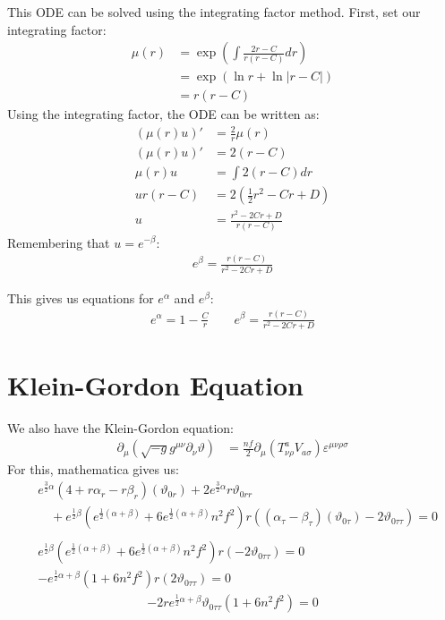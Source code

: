 \documentclass[12pt]{article}
\begin{document}
This ODE can be solved using the integrating factor method. First, set our integrating factor:
\begin{align*}
  \mu(r) &= \exp\left(\int \frac{2r-C}{r(r-C)} dr\right) \\
  &= \exp(\ln{r} + \ln|r-C|) \\
  &= r(r-C)
\end{align*}
Using the integrating factor, the ODE can be written as:
\begin{align*}
  (\mu(r)u)' &= \frac{2}{r}\mu(r) \\
  (\mu(r)u)' &= 2(r-C) \\
  \mu(r)u &= \int 2(r-C) dr \\
  ur(r-C) &= 2\left(\frac{1}{2}r^2 - Cr + D\right) \\
  u &= \frac{r^2 - 2Cr + D}{r(r-C)}
\end{align*}
Remembering that $u = e^{-\beta}$:
\begin{align}
  e^\beta = \frac{r(r-C)}{r^2 - 2Cr + D}
\end{align}

This gives us equations for $e^\alpha$ and $e^\beta$:
\begin{align*}
  e^\alpha = 1 - \frac{C}{r} \qquad e^\beta = \frac{r(r-C)}{r^2 - 2Cr + D}
\end{align*}

\section*{Klein-Gordon Equation}

We also have the Klein-Gordon equation:
\begin{align*}
  \partial_\mu\left(\sqrt{-g}g^{\mu\nu}\partial_\nu \vartheta \right) &= \frac{\mathit{nf}}{2} \partial_\mu\left(T_{\nu\rho}^a V_{a\sigma}\right) \varepsilon^{\mu\nu\rho\sigma}
\end{align*}
For this, mathematica gives us:
\begin{align*}
  &e^{\frac{3}{2}\alpha}(4 + r\alpha_r - r\beta_r)(\vartheta_{0r}) + 2e^{\frac{3}{2}\alpha}r\vartheta_{0rr} \\ & \quad + e^{\frac{1}{2}\beta} (e^{\frac{1}{2}(\alpha+\beta)}+6e^{\frac{1}{2}(\alpha+\beta)}n^2f^2)r((\alpha_\tau - \beta_\tau)(\vartheta_{0\tau}) - 2\vartheta_{0\tau\tau}) = 0 \\ \\
  &e^{\frac{1}{2}\beta} (e^{\frac{1}{2}(\alpha+\beta)}+6e^{\frac{1}{2}(\alpha+\beta)}n^2f^2)r(- 2\vartheta_{0\tau\tau}) = 0 \\
  &- e^{\frac{1}{2}\alpha + \beta} (1+6n^2f^2)r(2\vartheta_{0\tau\tau}) = 0
\end{align*}
\begin{align}
  - 2re^{\frac{1}{2}\alpha + \beta} \vartheta_{0\tau\tau}(1+6n^2f^2) = 0
\end{align}
\end{document}
